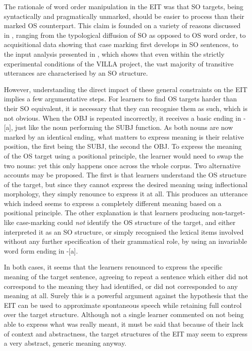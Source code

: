 The rationale of word order manipulation in the EIT was that SO targets, being syntactically and pragmatically unmarked, should be easier to process than their marked OS counterpart. This claim is founded on a variety of reasons discussed in , ranging from the typological diffusion of SO as opposed to OS word order, to acquisitional data showing that case marking first develops in SO sentences, to the input analysis presented in , which shows that even within the strictly experimental conditions of the VILLA project, the vast majority of transitive utterances are characterised by an SO structure.

However, understanding the direct impact of these general constraints on the EIT implies a few argumentative steps. For learners to find OS targets harder than their SO equivalent, it is necessary that they can recognise them as such, which is not obvious. When the OBJ is repeated incorrectly, it receives a basic ending in -[a], just like the noun performing the SUBJ function. As both nouns are now marked by an identical ending, what matters to express meaning is their relative position, the first being the SUBJ, the second the OBJ. To express the meaning of the OS target using a positional principle, the learner would need to swap the two nouns: yet this only happens once across the whole corpus. Two alternative accounts may be proposed. The first is that learners understand the OS structure of the target, but since they cannot express the desired meaning using inflectional morphology, they simply renounce to express it at all. This produces an utterance which indeed seems to express a completely different meaning based on a positional principle. The other explanation is that learners producing non-target-like case-marking could \textit{not} identify the OS structure of the target, and either interpreted it as an SO structure, or simply recognised the lexical items involved without any further specification of their grammatical role, by using an invariable word form ending in -[a]. 

In both cases, it seems that the learners renounced to express the specific meaning of the target sentence, agreeing to repeat a sentence which either did not correspond to the meaning they had identified, or did not corresponded to any meaning at all. Surely this is a powerful argument against the hypothesis that the EIT can be used to approximate spontaneous speech while retaining full control over the target structure. Although not a single learner commented on not being able to express what was really meant, it must be said that because of their lack of context and abstractness, the target structures of the EIT may seem to express a very abstract, generic meaning anyway. 

